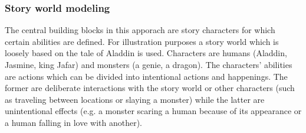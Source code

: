 \subsubsection{Story world modeling}
The central building blocks in this apporach are story characters for which certain abilities are defined. For illustration purposes a story world which is loosely based on the tale of Aladdin is used. Characters are humans (Aladdin, Jasmine, king Jafar) and monsters (a genie, a dragon). The characters' abilities are actions which can be divided into intentional actions and happenings. The former are deliberate interactions with the story world or other characters (such as traveling between locations or slaying a monster) while the latter are unintentional effects (e.g. a monster scaring a human because of its appearance or a human falling in love with another).

